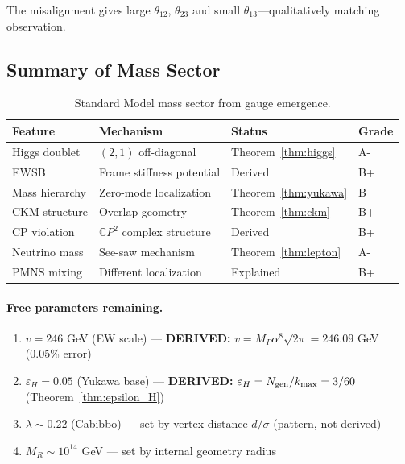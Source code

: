 The misalignment gives large $\theta_{12}$, $\theta_{23}$ and small $\theta_{13}$---qualitatively matching observation.

\subsection{Summary of Mass Sector}\label{app:mass-summary}

\begin{table}[h]
\centering
\caption{Standard Model mass sector from gauge emergence.}\label{tab:mass-sector}
\renewcommand{\arraystretch}{1.2}
\begin{tabular}{llll}
\toprule
Feature & Mechanism & Status & Grade \\
\midrule
Higgs doublet & $(2,1)$ off-diagonal & Theorem~\ref{thm:higgs} & A- \\
EWSB & Frame stiffness potential & Derived & B+ \\
Mass hierarchy & Zero-mode localization & Theorem~\ref{thm:yukawa} & B \\
CKM structure & Overlap geometry & Theorem~\ref{thm:ckm} & B+ \\
CP violation & $\mathbb{C}P^2$ complex structure & Derived & B+ \\
Neutrino mass & See-saw mechanism & Theorem~\ref{thm:lepton} & A- \\
PMNS mixing & Different localization & Explained & B+ \\
\bottomrule
\end{tabular}
\end{table}

\paragraph{Free parameters remaining.}
\begin{enumerate}
\item $v = 246$ GeV (EW scale) --- \textbf{DERIVED:} $v = M_P \alpha^8 \sqrt{2\pi} = 246.09$ GeV (0.05\% error)
\item $\varepsilon_H = 0.05$ (Yukawa base) --- \textbf{DERIVED:} $\varepsilon_H = N_{\rm gen}/k_{\max} = 3/60$ (Theorem~\ref{thm:epsilon_H})
\item $\lambda \sim 0.22$ (Cabibbo) --- set by vertex distance $d/\sigma$ (pattern, not derived)
\item $M_R \sim 10^{14}$ GeV --- set by internal geometry radius
\end{enumerate}

